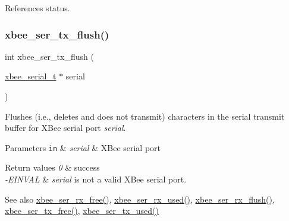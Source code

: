 References status.

\mbox{\label{group__xbee__serial_ga05308d37301d27715f1e1308b7189220}} 
\subsubsection{\texorpdfstring{xbee\+\_\+ser\+\_\+tx\+\_\+flush()}{xbee\_ser\_tx\_flush()}}
{\footnotesize\ttfamily int xbee\+\_\+ser\+\_\+tx\+\_\+flush (\begin{DoxyParamCaption}\item[{\hyperlink{structxbee__serial__t}{xbee\+\_\+serial\+\_\+t} $\ast$}]{serial }\end{DoxyParamCaption})}



Flushes (i.\+e., deletes and does not transmit) characters in the serial transmit buffer for X\+Bee serial port {\itshape serial}. 


\begin{DoxyParams}[1]{Parameters}
\mbox{\tt in}  & {\em serial} & X\+Bee serial port\\
\hline
\end{DoxyParams}

\begin{DoxyRetVals}{Return values}
{\em 0} & success \\
\hline
{\em -\/\+E\+I\+N\+V\+AL} & {\itshape serial} is not a valid X\+Bee serial port.\\
\hline
\end{DoxyRetVals}
\begin{DoxySeeAlso}{See also}
\hyperlink{group__xbee__serial_ga16fb431a1e66861439518e562431821f}{xbee\+\_\+ser\+\_\+rx\+\_\+free()}, \hyperlink{group__xbee__serial_ga43b8322771cc16b4130fa5330ad2242b}{xbee\+\_\+ser\+\_\+rx\+\_\+used()}, \hyperlink{group__xbee__serial_ga98a6d5ceb5e1445e8ef82ccaa65a8c15}{xbee\+\_\+ser\+\_\+rx\+\_\+flush()}, \hyperlink{group__xbee__serial_ga3ad8f378b572d6fec982f1086bd3b94f}{xbee\+\_\+ser\+\_\+tx\+\_\+free()}, \hyperlink{group__xbee__serial_gaabf70934d186354cde4ac14ed27d1bd2}{xbee\+\_\+ser\+\_\+tx\+\_\+used()} 
\end{DoxySeeAlso}
\mbox{\label{group__xbee__serial_ga3ad8f378b572d6fec982f1086bd3b94f}} 
